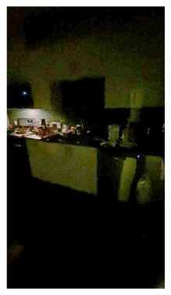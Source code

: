 \documentclass[letterpaper,12pt]{article}
\begin{document}
\begin{figure}[htbp]
\begin{subfigure}{0.128\textwidth}
			\includegraphics[width=\linewidth]{LoLi-Phone-imgT/Zero-DCE}
			\captionsetup{font=scriptsize}
			\caption{}
			\label{fig: LoLi-Phone-imgT_m}  
		\end{subfigure}
		\begin{subfigure}{0.128\textwidth}

\end{subfigure}
\end{figure}
\end{document}
